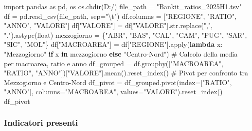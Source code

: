 \documentclass[
  letterpaper,
  DIV=11,
  numbers=noendperiod]{scrartcl}
\newenvironment{Shaded}{\begin{snugshade}}{\end{snugshade}}
\newcommand{\BuiltInTok}[1]{\textcolor[rgb]{0.00,0.23,0.31}{#1}}
\newcommand{\CharTok}[1]{\textcolor[rgb]{0.13,0.47,0.30}{#1}}
\newcommand{\CommentTok}[1]{\textcolor[rgb]{0.37,0.37,0.37}{#1}}
\newcommand{\ControlFlowTok}[1]{\textcolor[rgb]{0.00,0.23,0.31}{\textbf{#1}}}
\newcommand{\ImportTok}[1]{\textcolor[rgb]{0.00,0.46,0.62}{#1}}
\newcommand{\KeywordTok}[1]{\textcolor[rgb]{0.00,0.23,0.31}{\textbf{#1}}}
\newcommand{\NormalTok}[1]{\textcolor[rgb]{0.00,0.23,0.31}{#1}}
\newcommand{\OperatorTok}[1]{\textcolor[rgb]{0.37,0.37,0.37}{#1}}
\newcommand{\StringTok}[1]{\textcolor[rgb]{0.13,0.47,0.30}{#1}}
\begin{document}
\begin{Shaded}
\begin{Highlighting}[]
\ImportTok{import}\NormalTok{ pandas }\ImportTok{as}\NormalTok{ pd, os}
\NormalTok{os.chdir(}\StringTok{\textquotesingle{}D:/\textquotesingle{}}\NormalTok{)}
\NormalTok{file\_path }\OperatorTok{=} \StringTok{"Bankit\_ratios\_2025H1.tsv"}
\NormalTok{df }\OperatorTok{=}\NormalTok{ pd.read\_csv(file\_path, sep}\OperatorTok{=}\StringTok{"}\CharTok{\textbackslash{}t}\StringTok{"}\NormalTok{)}
\NormalTok{df.columns }\OperatorTok{=}\NormalTok{ [}\StringTok{"REGIONE"}\NormalTok{, }\StringTok{"RATIO"}\NormalTok{, }\StringTok{"ANNO"}\NormalTok{, }\StringTok{"VALORE"}\NormalTok{]}
\NormalTok{df[}\StringTok{"VALORE"}\NormalTok{] }\OperatorTok{=}\NormalTok{ df[}\StringTok{"VALORE"}\NormalTok{].}\BuiltInTok{str}\NormalTok{.replace(}\StringTok{","}\NormalTok{, }\StringTok{"."}\NormalTok{).astype(}\BuiltInTok{float}\NormalTok{)}
\NormalTok{mezzogiorno }\OperatorTok{=}\NormalTok{ \{}\StringTok{"ABR"}\NormalTok{, }\StringTok{"BAS"}\NormalTok{, }\StringTok{"CAL"}\NormalTok{, }\StringTok{"CAM"}\NormalTok{, }\StringTok{"PUG"}\NormalTok{, }\StringTok{"SAR"}\NormalTok{, }\StringTok{"SIC"}\NormalTok{, }\StringTok{"MOL"}\NormalTok{\}}
\NormalTok{df[}\StringTok{"MACROAREA"}\NormalTok{] }\OperatorTok{=}\NormalTok{ df[}\StringTok{"REGIONE"}\NormalTok{].}\BuiltInTok{apply}\NormalTok{(}\KeywordTok{lambda}\NormalTok{ x: }\StringTok{"Mezzogiorno"} \ControlFlowTok{if}\NormalTok{ x }\KeywordTok{in}\NormalTok{ mezzogiorno }\ControlFlowTok{else} \StringTok{"Centro{-}Nord"}\NormalTok{)}
\CommentTok{\# Calcolo della media per macroarea, ratio e anno}
\NormalTok{df\_grouped }\OperatorTok{=}\NormalTok{ df.groupby([}\StringTok{"MACROAREA"}\NormalTok{, }\StringTok{"RATIO"}\NormalTok{, }\StringTok{"ANNO"}\NormalTok{])[}\StringTok{"VALORE"}\NormalTok{].mean().reset\_index()}
\CommentTok{\# Pivot per confronto tra Mezzogiorno e Centro{-}Nord}
\NormalTok{df\_pivot }\OperatorTok{=}\NormalTok{ df\_grouped.pivot(index}\OperatorTok{=}\NormalTok{[}\StringTok{"RATIO"}\NormalTok{, }\StringTok{"ANNO"}\NormalTok{], columns}\OperatorTok{=}\StringTok{"MACROAREA"}\NormalTok{, values}\OperatorTok{=}\StringTok{"VALORE"}\NormalTok{).reset\_index()}
\NormalTok{df\_pivot}
\end{Highlighting}
\end{Shaded}

\subsubsection{Indicatori presenti}\label{indicatori-presenti}
\end{document}
